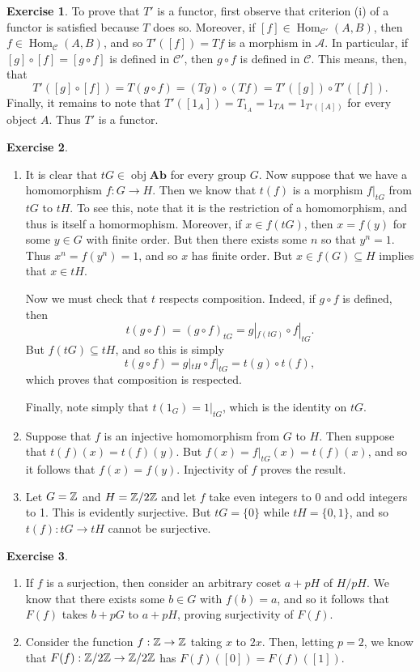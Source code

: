 \documentclass[10pt]{article}
\theoremstyle{definition}
\newtheorem{intex}{Exercise}[section]
\newenvironment{exercise}{\begin{intex}\label{\theintex}}{\end{intex}}
\DeclareMathOperator\obj{obj}
\DeclareMathOperator\Hom{Hom}
\newcommand*\cat[1]{\mathcal{#1}}
\newcommand*\Cat[1]{\textbf{#1}}
\begin{document}
\begin{exercise} \leavevmode
To prove that $T'$ is a functor, first observe that criterion (i) of a functor is satisfied because $T$ does so. Moreover, if $[f]\in\Hom_{\cat C'}(A,B)$, then $f\in\Hom_{\cat C}(A,B)$, and so $T'([f])=Tf$ is a morphism in $\cat A$. In particular, if $[g]\circ[f]=[g\circ f]$ is defined in $\cat C'$, then $g\circ f$ is defined in $\cat C$. This means, then, that \[T'([g]\circ[f])=T(g\circ f)=(Tg)\circ(Tf)=T'([g])\circ T'([f]).\] Finally, it remains to note that $T'([1_A])=T_{1_A}=1_{TA}=1_{T'([A])}$ for every object $A$. Thus $T'$ is a functor.
\end{exercise} 

\begin{exercise} \leavevmode 
\begin{enumerate} 
\item It is clear that $tG\in\obj\Cat{Ab}$ for every group $G$. Now suppose that we have a homomorphism $f:G\to H$. Then we know that $t(f)$ is a morphism $f|_{tG}$ from $tG$ to $tH$. To see this, note that it is the restriction of a homomorphism, and thus is itself a homormophism. Moreover, if $x\in f(tG)$, then $x=f(y)$ for some $y\in G$ with finite order. But then there exists some $n$ so that $y^n=1$. Thus $x^n=f(y^n)=1$, and so $x$ has finite order. But $x\in f(G)\subseteq H$ implies that $x\in tH$. 

Now we must check that $t$ respects composition. Indeed, if $g\circ f$ is defined, then \[t(g\circ f)=(g\circ f)_{tG}=g|_{f(tG)}\circ f|_{tG}.\] But $f(tG)\subseteq tH$, and so this is simply \[t(g\circ f)=g|_{tH}\circ f|_{tG}=t(g)\circ t(f),\] which proves that composition is respected. 

Finally, note simply that $t(1_G)=1|_{tG}$, which is the identity on $tG$. 

\item Suppose that $f$ is an injective homomorphism from $G$ to $H$. Then suppose that $t(f)(x)=t(f)(y)$. But $f(x)=f|_{tG}(x)=t(f)(x)$, and so it follows that $f(x)=f(y)$. Injectivity of $f$ proves the result. 

\item Let $G=\mathbb{Z}$ and $H=\mathbb{Z}/2\mathbb{Z}$ and let $f$ take even integers to 0 and odd integers to 1. This is evidently surjective. But $tG=\{0\}$ while $tH=\{0,1\}$, and so $t(f):tG\to tH$ cannot be surjective. 
\end{enumerate}
\end{exercise} 

\begin{exercise} \leavevmode 
\begin{enumerate}
\item If $f$ is a surjection, then consider an arbitrary coset $a+pH$ of $H/pH$. We know that there exists some $b\in G$ with $f(b)=a$, and so it follows that $F(f)$ takes $b+pG$ to $a+pH$, proving surjectivity of $F(f)$. 

\item Consider the function $f:\mathbb{Z}\to\mathbb{Z}$ taking $x$ to $2x$. Then, letting $p=2$, we know that $F(f):\mathbb{Z}/2\mathbb{Z}\to\mathbb{Z}/2\mathbb{Z}$ has $F(f)([0])=F(f)([1])$. 
\end{enumerate}
\end{exercise} 
\end{document}
